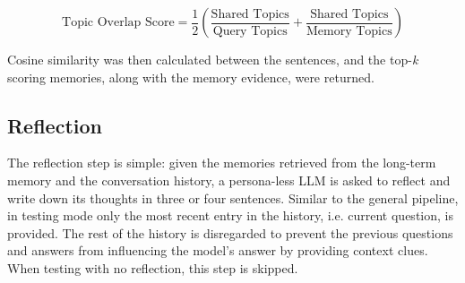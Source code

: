 \[
\text{Topic Overlap Score} = \frac{1}{2} ( \frac{\text{Shared Topics}}{\text{Query Topics}} + \frac{\text{Shared Topics}}{\text{Memory Topics}} )
\]

\noindent Cosine similarity was then calculated between the sentences, and the top-\textit{k} scoring memories, along with the memory evidence, were returned.



\subsection{Reflection}

The reflection step is simple: given the memories retrieved from the long-term memory and the conversation history, a persona-less LLM is asked to reflect and write down its thoughts in three or four sentences. Similar to the general pipeline, in testing mode only the most recent entry in the history, i.e. current question, is provided. The rest of the history is disregarded to prevent the previous questions and answers from influencing the model's answer by providing context clues. When testing with no reflection, this step is skipped.














